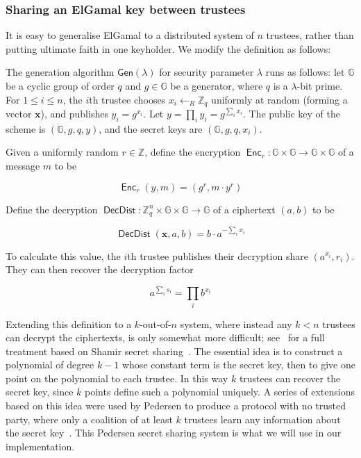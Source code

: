 \documentclass[12pt,a4paper]{article}
\DeclareMathOperator{\Enc}{\mathsf{Enc}}
\DeclareMathOperator{\DecDist}{\mathsf{DecDist}}
\theoremstyle{definition}
\begin{document}
\subsubsection{Sharing an ElGamal key between trustees}
It is easy to generalise ElGamal to a distributed system of $n$ trustees, rather than putting ultimate faith in one keyholder. We modify the definition as follows:
\begin{definition}
    The generation algorithm $\mathsf{Gen}(\lambda)$ for security parameter $\lambda$ runs as follows: let $\mathbb{G}$ be a cyclic group of order $q$ and $g\in\mathbb{G}$ be a generator, where $q$ is a $\lambda$-bit prime. For $1\leq i\leq n$, the $i$th trustee chooses $x_i\gets_R\mathbb{Z}_q$ uniformly at random (forming a vector $\mathbf{x}$), and publishes $y_i=g^{x_i}$. Let $y=\prod_i y_i=g^{\sum_i x_i}$. The public key of the scheme is $(\mathbb{G}, g, q, y)$, and the secret keys are $(\mathbb{G}, g, q, x_i)$.

    Given a uniformly random $r\in\mathbb{Z}$, define the encryption $\Enc_r:\mathbb{G}\times\mathbb{G}\rightarrow\mathbb{G}\times\mathbb{G}$ of a message $m$ to be
    
    $$\Enc_r(y, m) = (g^r, m\cdot y^r)$$

    Define the decryption $\DecDist:\mathbb{Z}_q^n\times\mathbb{G}\times\mathbb{G}\rightarrow \mathbb{G}$ of a ciphertext $(a, b)$ to be
    
    $$\DecDist(\mathbf{x}, a, b)=b\cdot a^{-\sum_i x_i}$$
    
    To calculate this value, the $i$th trustee publishes their decryption share $\left(a^{x_i}, r_i\right)$. They can then recover the decryption factor
    
    $$a^{\sum_i s_i}=\prod_i{b^{x_i}}$$
\end{definition}
Extending this definition to a $k$-out-of-$n$ system, where instead any $k<n$ trustees can decrypt the ciphertexts, is only somewhat more difficult; see~\cite{pedersen1991threshold} for a full treatment based on Shamir secret sharing~\cite{shamir1979share}. The essential idea is to construct a polynomial of degree $k-1$ whose constant term is the secret key, then to give one point on the polynomial to each trustee. In this way $k$ trustees can recover the secret key, since $k$ points define such a polynomial uniquely. A series of extensions based on this idea were used by Pedersen to produce a protocol with no trusted party, where only a coalition of at least $k$ trustees learn any information about the secret key~\cite{pedersen1991threshold}. This Pedersen secret sharing system is what we will use in our implementation.
\end{document}
